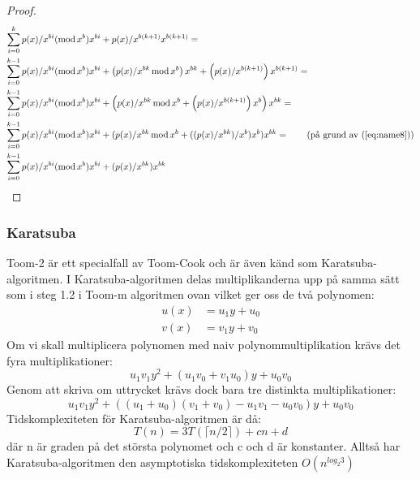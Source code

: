 \begin{proof}
  \begin{align*}
    \sum_{i = 0}^{k} p(x)/x^{bi} (\modu x^b) x^{bi} &+ p(x)/x^{b(k + 1)}  x^{b(k + 1)} =\\
    \sum_{i = 0}^{k-1} p(x)/x^{bi} (\modu x^b) x^{bi} &+
    \left(p(x)/x^{b k} \modu x^b\right) x^{b k} + \left(p(x)/x^{b(k + 1)}\right)  x^{b(k + 1)} = \\
    \sum_{i = 0}^{k-1} p(x)/x^{bi} (\modu x^b) x^{bi} &+
    \left(p(x)/x^{b k} \modu x^b + \left(p(x)/x^{b(k + 1)}\right)  x^b \right) x^{b k} = \\
    \sum_{i = 0}^{k-1} p(x)/x^{bi} (\modu x^b) x^{bi} &+
    (p(x)/x^{b k} \modu x^b + ((p(x)/x^{b k})/x^b)  x^b) x^{b k} =
    \tag{på grund av (\ref{eq:name8})}\\
    \sum_{i = 0}^{k-1} p(x)/x^{bi}  (\modu x^b) x^{bi} &+ (p(x)/x^{b k}) x^{b k}
  \end{align*}
\end{proof}

\subsubsection{Karatsuba}
Toom-2 är ett specialfall av Toom-Cook och är även känd som
Karatsuba-algoritmen. I Karatsuba-algoritmen delas multiplikanderna upp på
samma sätt som i steg 1.2 i Toom-m algoritmen ovan vilket ger oss de två
polynomen:
\begin{align*}
  u(x) &= u_1 y + u_0 \\
  v(x) &= v_1 y + v_0
\end{align*}
Om vi skall multiplicera polynomen med naiv polynommultiplikation krävs det
fyra multiplikationer:
\begin{equation*}
  u_1 v_1 y^2 + (u_1 v_0+v_1 u_0) y + u_0 v_0
\end{equation*}
Genom att skriva om uttrycket krävs dock bara tre distinkta multiplikationer:
\begin{equation*}
  u_1 v_1 y^2 + ((u_1 + u_0)(v_1 + v_0) - u_1 v_1 - u_0 v_0) y + u_0 v_0
\end{equation*}
Tidskomplexiteten för Karatsuba-algoritmen är då:
\begin{equation*}
  T(n) = 3 T(\lceil n/2\rceil) + cn + d
\end{equation*}
där n är graden på det största polynomet och c och d är konstanter. Alltså har
Karatsuba-algoritmen den asymptotiska tidskomplexiteten $O(n^{log_2 3})$
